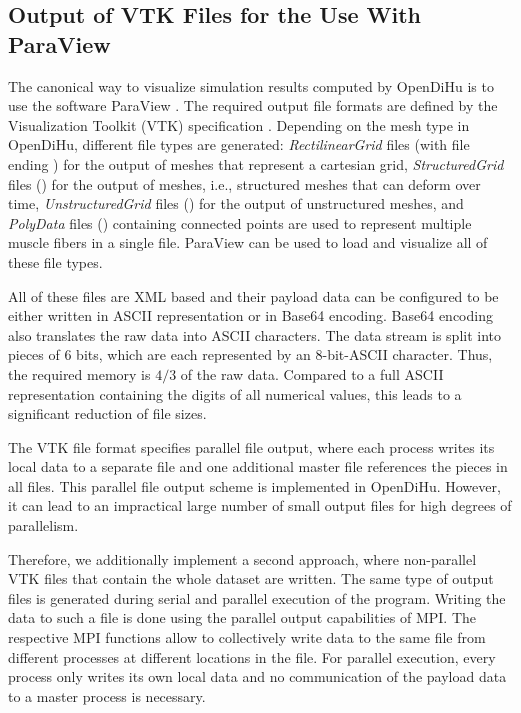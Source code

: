 \subsection{Output of VTK Files for the Use With ParaView}
The canonical way to visualize simulation results computed by OpenDiHu is to use the software ParaView \cite{paraview}. 
The required output file formats are defined by the Visualization Toolkit (VTK) specification \cite{vtk}. Depending on the mesh type in OpenDiHu, different file types are generated:
\emph{RectilinearGrid} files (with file ending ) for the output of  meshes that represent a cartesian grid,
\emph{StructuredGrid} files () for the output of  meshes, i.e., structured meshes that can deform over time, 
\emph{UnstructuredGrid} files () for the output of unstructured meshes, and
\emph{PolyData} files () containing connected points are used to represent multiple muscle fibers in a single file.
ParaView can be used to load and visualize all of these file types.

All of these files are XML based and their payload data can be configured to be either written in ASCII representation or in Base64 encoding. Base64 encoding also translates the raw data into ASCII characters. The data stream is split into pieces of 6 bits, which are each represented by an 8-bit-ASCII character. Thus, the required memory is $4/3$ of the raw data. Compared to a full ASCII representation containing the digits of all numerical values, this leads to a significant reduction of file sizes.

The VTK file format specifies parallel file output, where each process writes its local data to a separate file and one additional master file references the pieces in all files. This parallel file output scheme is implemented in OpenDiHu. However, it can lead to an impractical large number of small output files for high degrees of parallelism. 

Therefore, we additionally implement a second approach, where non-parallel VTK files that contain the whole dataset are written. The same type of output files is generated during serial and parallel execution of the program. 
Writing the data to such a file is done using the parallel output capabilities of MPI. The respective MPI functions allow to collectively write data to the same file from different processes at different locations in the file. For parallel execution, every process only writes its own local data and no communication of the payload data to a master process is necessary. 

